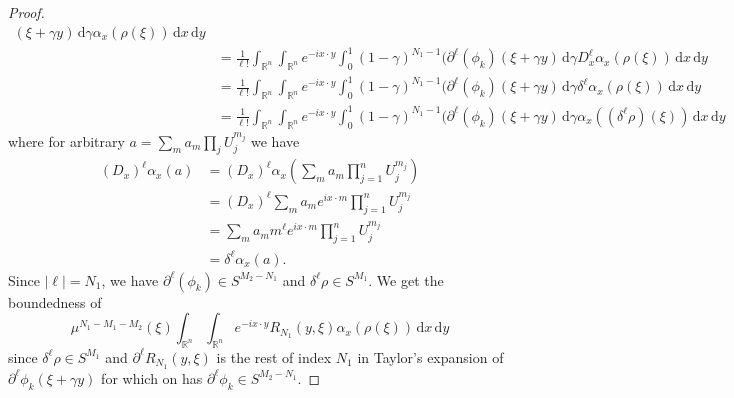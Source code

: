 \documentclass[10pt]{article}
\theoremstyle{remark}
\theoremstyle{definition}
\begin{document}
\begin{proof}
\begin{align*}
(\xi+\gamma y)\,\mathrm d\gamma\alpha_x(\rho(\xi))\,\mathrm dx\,\mathrm dy \\
&= \frac{1}{\ell!}\int_{\mathbb R^n}\!\int_{\mathbb R^n}\!
e^{-ix\cdot y}\int_0^1(1-\gamma)^{N_1-1}(\partial^{\ell}(\phi_k)
(\xi+\gamma y)\,\mathrm d\gamma D_x^{\ell}\alpha_x(\rho(\xi))
\,\mathrm dx\,\mathrm dy \\
&= \frac{1}{\ell!}\int_{\mathbb R^n}\!\int_{\mathbb R^n}\!
e^{-ix\cdot y}\int_0^1(1-\gamma)^{N_1-1}(\partial^{\ell}(\phi_k)
(\xi+\gamma y)\,\mathrm d\gamma\delta^{\ell}\alpha_x(\rho(\xi))
\,\mathrm dx\,\mathrm dy \\
&= \frac{1}{\ell!}\int_{\mathbb R^n}\!\int_{\mathbb R^n}\!
e^{-ix\cdot y}\int_0^1(1-\gamma)^{N_1-1}(\partial^{\ell}(\phi_k)
(\xi+\gamma y)\,\mathrm d\gamma\alpha_x((\delta^{\ell}\rho)(\xi))
\,\mathrm dx\,\mathrm dy
\end{align*}
where for arbitrary $a=\sum_ma_m\prod_jU_j^{m_j}$ we have
\begin{align*}
(D_x)^{\ell}\alpha_x(a)
&= (D_x)^{\ell}\alpha_x\left(\sum_ma_m\prod_{j=1}^nU_j^{m_j}\right) \\
&= (D_x)^{\ell}\sum_ma_me^{ix\cdot m}\prod_{j=1}^nU_j^{m_j} \\
&= \sum_m a_m m^{\ell}e^{ix\cdot m}\prod_{j=1}^nU_j^{m_j} \\
&= \delta^{\ell}\alpha_x(a).
\end{align*}
Since $|\ell|=N_1$, we have $\partial^{\ell}(\phi_k)\in S^{M_2-N_1}$
and $\delta^{\ell}\rho\in S^{M_1}$. We get the boundedness of
$$\mu^{N_1-M_1-M_2}(\xi)\int_{\mathbb R^n}\!\int_{\mathbb R^n}\!
e^{-ix\cdot y}R_{N_1}(y,\xi)\alpha_x(\rho(\xi))\,\mathrm dx\,\mathrm dy$$
since $\delta^{\ell}\rho\in S^{M_1}$ and
$\partial^{\ell}R_{N_1}(y,\xi)$ is the rest of index $N_1$ in
Taylor's expansion of $\partial^{\ell}\phi_k(\xi+\gamma y)$ for which
on has $\partial^{\ell}\phi_k\in S^{M_2-N_1}$.
\end{proof}
\end{document}
